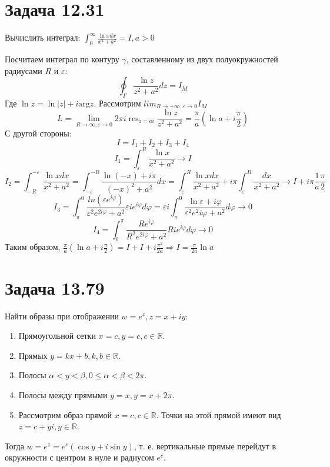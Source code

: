 \documentclass[11pt]{article}
\begin{document}
\section{Задача 12.31}
\label{sec:orgb5b40d5}
Вычислить интеграл: \(\int_0^\infty\frac{\ln xdx}{x^2 + a^2} = I, a > 0\)

Посчитаем интеграл по контуру \(\gamma\), составленному из двух полуокружностей радиусами \(R\) и \(\varepsilon\):
$$\oint_\Gamma\frac{\ln z}{z^2 + a^2}dz = I_M$$
Где \(\ln z = \ln |z| + i\mathrm{arg} z\).
Рассмотрим \(lim_{R \to +\infty, \varepsilon \to 0}I_M\)
$$L  = \lim_{R \to \infty, \varepsilon \to 0}2\pi i\operatorname{res}_{z = ai}\frac{\ln z}{z^2 + a^2} = \frac{\pi}{a}\left(\ln a + i\frac{\pi}2\right)$$
С другой стороны:
$$I = I_1 + I_2 + I_3 + I_4$$
$$I_1 = \int_{\varepsilon}^R\frac{\ln x}{x^2 + a^2} \to I$$
$$I_2 = \int_{-R}^{-\varepsilon}\frac{\ln xdx}{x^2 + a^2} = \int_{-\varepsilon}^{-R}\frac{\ln(-x) + i\pi}{(-x)^2 + a^2}dx
= \int_\varepsilon^R\frac{\ln xdx}{x^2 + a^2} + i\pi\int_\varepsilon^R\frac{dx}{x^2 + a^2} \to I + i\pi\frac{1}a\frac{\pi}2$$
$$I_3 = \int_\pi^0\frac{ln(\varepsilon e^{i\varphi})}{\varepsilon^2e^{2i\varphi} + a^2}\varepsilon ie^{i\varphi}d\varphi
= \varepsilon i\int_\pi^0\frac{\ln \varepsilon + i\varphi}{\varepsilon^2e^2i\varphi + a^2}d\varphi \to 0$$
$$I_4 = \int_0^\pi\frac{Re^{i\varphi}}{R^2e^{2i\varphi} + a^2}Rie^{i\varphi}d\varphi \to 0$$
Таким образом, \(\frac{\pi}a\left(\ln a + i\frac{\pi}2\right) = I + I + i\frac{\pi^2}{2a} \Rightarrow I = \frac{\pi}{2a}\ln a\)
\section{Задача 13.79}
\label{sec:org315f839}
Найти образы при отображении \(w = e^z, z = x + iy\):
\begin{enumerate}
\item Прямоугольной сетки \(x = c, y = c, c \in \mathbb{R}\).
\item Прямых \(y = kx + b, k, b \in \mathbb{R}\).
\item Полосы \(\alpha < y < \beta, 0 \leq \alpha < \beta < 2\pi\).
\item Полосы между прямыми \(y = x, y = x + 2\pi\).

\item Рассмотрим образ прямой \(x = c, c \in \mathbb{R}\). Точки на этой прямой имеют вид \(z = c + yi, y \in \mathbb{R}\).
\end{enumerate}
Тогда \(w = e^z = e^c(\cos y + i\sin y)\), т. е. вертикальные прямые перейдут в окружности с центром в нуле и радиусом \(e^c\).
\end{document}
